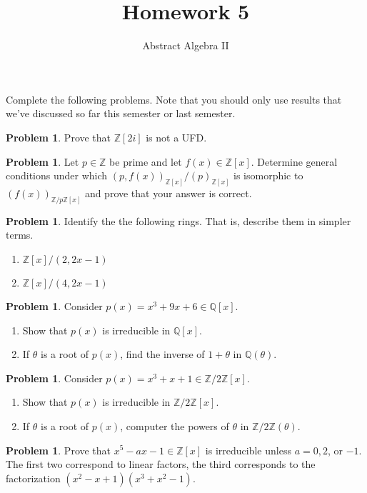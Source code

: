 \documentclass[11pt]{scrartcl}
\theoremstyle{definition}
\newtheorem{problem}[theorem]{Problem}
\newcommand{\blankline}{\pagebreak[2]\vspace{.5\baselineskip}}
\begin{document}
\title{Homework 5}
\subtitle{Abstract Algebra II}
\date{}

\maketitle
\thispagestyle{fancy}

Complete the following problems. Note that you should only use results that we've discussed so far this semester or last semester.

%

\begin{problem}
Prove that $\mathbb{Z}[2i]$ is not a UFD.
\end{problem}

\begin{problem}
Let $p\in \mathbb{Z}$ be prime and let $f(x)\in \mathbb{Z}[x]$.  Determine general conditions under which $(p,f(x))_{\mathbb{Z}[x]}/(p)_{\mathbb{Z}[x]}$ is isomorphic to $(f(x))_{\mathbb{Z}/p\mathbb{Z}[x]}$ and prove that your answer is correct.
\end{problem}

\begin{problem}
Identify the the following rings. That is, describe them in simpler terms.
\begin{enumerate}[label=\rm{(\alph*)}]
\item $\mathbb{Z}[x]/(2,2x-1)$
\item $\mathbb{Z}[x]/(4,2x-1)$
\end{enumerate}
\end{problem}

\begin{problem}
Consider $p(x)=x^3+9x+6\in\mathbb{Q}[x]$.
\begin{enumerate}[label=\rm{(\alph*)}]
\item Show that $p(x)$ is irreducible in $\mathbb{Q}[x]$.
\item If $\theta$ is a root of $p(x)$, find the inverse of $1+\theta$ in $\mathbb{Q}(\theta)$.
\end{enumerate}
\end{problem}

\begin{problem}
Consider $p(x)=x^3+x+1\in\mathbb{Z}/2\mathbb{Z}[x]$.
\begin{enumerate}[label=\rm{(\alph*)}]
\item Show that $p(x)$ is irreducible in $\mathbb{Z}/2\mathbb{Z}[x]$.
\item If $\theta$ is a root of $p(x)$, computer the powers of $\theta$ in $\mathbb{Z}/2\mathbb{Z}(\theta)$.
\end{enumerate}
\end{problem}

\begin{problem}
Prove that $x^5-ax-1\in\mathbb{Z}[x]$ is irreducible unless $a=0,2$, or $-1$.  The first two correspond to linear factors, the third corresponds to the factorization $(x^2-x+1)(x^3+x^2-1)$.
\end{problem}
\end{document}
